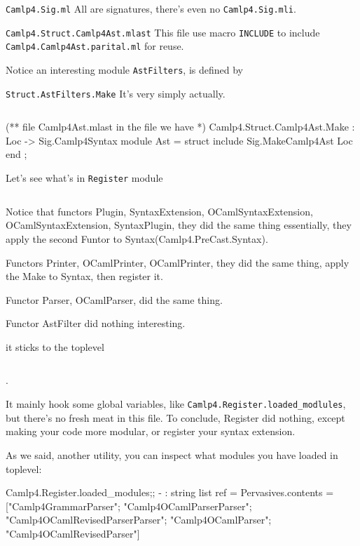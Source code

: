 \verb|Camlp4.Sig.ml| All are signatures, there's even no
\verb|Camlp4.Sig.mli|.

\verb|Camlp4.Struct.Camlp4Ast.mlast| This file use macro
\verb|INCLUDE| to include \verb|Camlp4.Camlp4Ast.parital.ml| for
reuse.
    
Notice an interesting module \verb|AstFilters|, is defined by 

\verb|Struct.AstFilters.Make|
It's very simply actually.
\label{AstFilters}
\inputminted[fontsize=\scriptsize,]{ocaml}{camlp4/code/AstFilters.ml}



\begin{ocamlcode}
(** file Camlp4Ast.mlast 
  in the file we have *)
Camlp4.Struct.Camlp4Ast.Make : Loc -> Sig.Camlp4Syntax
  module Ast = struct
     include Sig.MakeCamlp4Ast Loc 
  end ;
\end{ocamlcode}


Let's see what's in \verb|Register| module
\inputminted[fontsize=\scriptsize,
            ]{ocaml}{camlp4/code/Register.ml}


Notice that functors Plugin, SyntaxExtension, OCamlSyntaxExtension,
OCamlSyntaxExtension, SyntaxPlugin, they did the same thing
essentially, they apply the second Funtor to Syntax(Camlp4.PreCast.Syntax).

Functors Printer, OCamlPrinter, OCamlPrinter, they did the same thing,
apply the Make to Syntax, then register it. 

Functor Parser, OCamlParser, did the same thing. 

Functor AstFilter  did nothing interesting.

it sticks to the toplevel 

\inputminted[fontsize=\scriptsize,
             firstline=123,
             lastline=126,
            ]{ocaml}{camlp4/code/Register.ml}.

It mainly hook some global variables, like
\verb|Camlp4.Register.loaded_modlules|, but there's no fresh meat in
this file.
To conclude, Register did nothing, except making your code more
modular, or register your syntax extension.

As we said, another utility, you can inspect what modules you have
loaded in toplevel:
\begin{ocamlcode}
Camlp4.Register.loaded_modules;;
- : string list ref =
{Pervasives.contents =
  ["Camlp4GrammarParser"; "Camlp4OCamlParserParser";
   "Camlp4OCamlRevisedParserParser"; "Camlp4OCamlParser";
   "Camlp4OCamlRevisedParser"]}
\end{ocamlcode}



